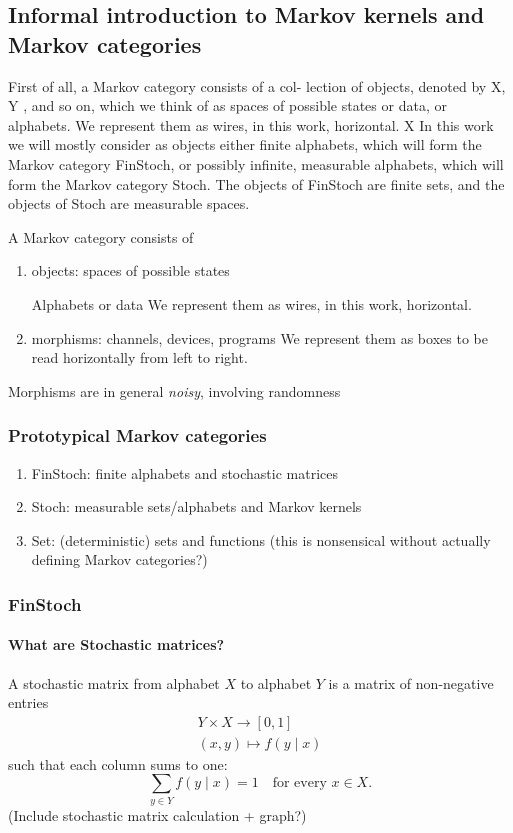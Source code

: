 \subsection{Informal introduction to Markov kernels and Markov categories}

\begin{frame}
First of all, a Markov category consists of a col- lection of objects, denoted by X, Y , and so on, which we think of as spaces of possible states or data, or alphabets. We represent them as wires, in this work, horizontal.  X In this work we will mostly consider as objects either finite alphabets, which will form the Markov category FinStoch, or possibly infinite, measurable alphabets, which will form the Markov category Stoch. The objects of FinStoch are finite sets, and the objects of Stoch are measurable spaces.
\end{frame}

\begin{frame}
    A Markov category consists of
    \begin{enumerate}
        \item objects: spaces of possible states\par
            Alphabets or data
            We represent them as wires, in this work, horizontal.
        \item morphisms: channels, devices, programs
            We represent them as boxes to be read horizontally from left to right.
    \end{enumerate}
    Morphisms are in general \emph{noisy}, involving randomness
\end{frame}

\begin{frame}
    \frametitle{Prototypical Markov categories}
    \begin{enumerate}
        \item FinStoch: finite alphabets and stochastic matrices
        \item Stoch: measurable sets/alphabets and Markov kernels
        \item Set: (deterministic) sets and functions (this is nonsensical without actually defining Markov categories?)
    \end{enumerate}
\end{frame}

\begin{frame}
    \frametitle{FinStoch}
    \framesubtitle{What are Stochastic matrices?}
    A stochastic matrix from alphabet $X$ to alphabet $Y$ is a matrix of non-negative entries
    \begin{align*}
        Y\times X \to [0,1]\\
        (x, y) \mapsto f(y\mid x)
    \end{align*}
    such that each column sums to one:
    \[
        \sum_{y\in Y} f(y\mid x) = 1 \quad \text{for every $x\in X$.}
    \]
    (Include stochastic matrix calculation + graph?)
\end{frame}

